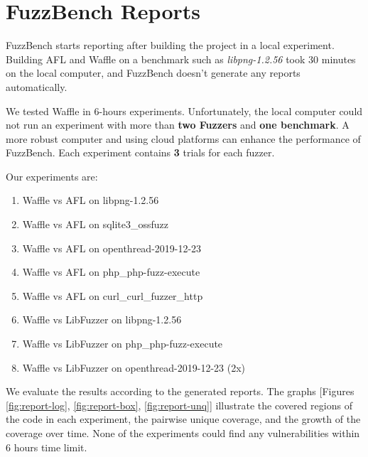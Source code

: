 \section{FuzzBench Reports}
\label{sec:report}

FuzzBench starts reporting after building the project in a local experiment. Building AFL and Waffle on a benchmark such as \textit{libpng-1.2.56} took 30 minutes on the local computer, and FuzzBench doesn't generate any reports automatically.

We tested Waffle in 6-hours experiments. Unfortunately, the local computer could not run an experiment with more than \textbf{two Fuzzers} and \textbf{one benchmark}. A more robust computer and using cloud platforms can enhance the performance of FuzzBench. Each experiment contains \textbf{3} trials for each fuzzer.

Our experiments are:

\begin{enumerate}
    \item Waffle vs AFL on libpng-1.2.56
    \item Waffle vs AFL on sqlite3\_ossfuzz
    \item Waffle vs AFL on openthread-2019-12-23
    \item Waffle vs AFL on php\_php-fuzz-execute
    \item Waffle vs AFL on curl\_curl\_fuzzer\_http
    \item Waffle vs LibFuzzer on libpng-1.2.56
    \item Waffle vs LibFuzzer on php\_php-fuzz-execute
    \item Waffle vs LibFuzzer on openthread-2019-12-23 (2x)
\end{enumerate}

We evaluate the results according to the generated reports. The graphs [Figures \ref{fig:report-log}, \ref{fig:report-box}, \ref{fig:report-unq}] illustrate the covered regions of the code in each experiment, the pairwise unique coverage, and the growth of the coverage over time. None of the experiments could find any vulnerabilities within 6 hours time limit.

